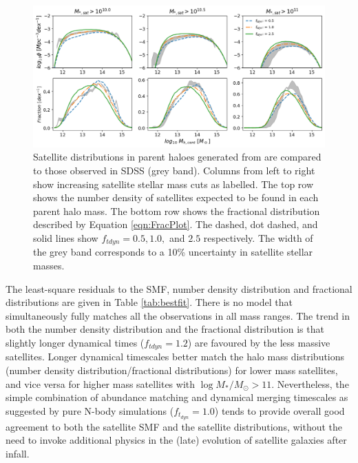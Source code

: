 \begin{figure}[h]
    \centering
    \includegraphics[width = \linewidth]{Figures/Chapter3/Tdyn_Sat_Dist.png}
    \caption{Satellite distributions in parent haloes generated from \steel are compared to those observed in SDSS (grey band). Columns from left to right show increasing satellite stellar mass cuts as labelled. The top row shows the number density of satellites expected to be found in each parent halo mass. The bottom row shows the fractional distribution described by Equation \ref{eqn:FracPlot}. The dashed, dot dashed, and solid lines show $f_{tdyn} = 0.5, 1.0,$ and $2.5$ respectively. The width of the grey band corresponds to a 10\% uncertainty in satellite stellar masses.}
    \label{fig:Sat_Dist_Tdyn}
\end{figure}

The least-square residuals to the SMF, number density distribution and fractional distributions are given in Table \ref{tab:bestfit}. There is no model that simultaneously fully matches all the observations in all mass ranges. The trend in both the number density distribution and the fractional distribution is that slightly longer dynamical times ($f_{tdyn}  = 1.2$) are favoured by the less massive satellites. Longer dynamical timescales better match the halo mass distributions (number density distribution/fractional distributions) for lower mass satellites, and vice versa for higher mass satellites with $\log M_{*}/M_{\odot} >11$. Nevertheless, the simple combination of abundance matching and dynamical merging timescales as suggested by pure N-body simulations ($f_{t_{dyn}} = 1.0$) tends to provide overall good agreement to both the satellite SMF and the satellite distributions, without the need to invoke additional physics in the (late) evolution of satellite galaxies after infall.

